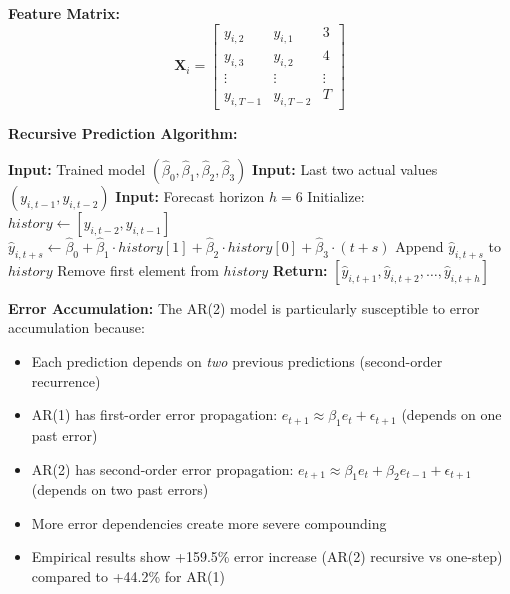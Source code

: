 \documentclass[12pt,a4paper]{article}
\begin{document}
\textbf{Feature Matrix:}
\begin{equation}
\mathbf{X}_i = \begin{bmatrix}
y_{i,2} & y_{i,1} & 3 \\
y_{i,3} & y_{i,2} & 4 \\
\vdots & \vdots & \vdots \\
y_{i,T-1} & y_{i,T-2} & T
\end{bmatrix}
\end{equation}

\textbf{Recursive Prediction Algorithm:}

\begin{algorithm}[H]
\caption{AR(2) Recursive Multi-Step Forecasting}
\begin{algorithmic}[1]
\State \textbf{Input:} Trained model $(\hat{\beta}_0, \hat{\beta}_1, \hat{\beta}_2, \hat{\beta}_3)$
\State \textbf{Input:} Last two actual values $(y_{i,t-1}, y_{i,t-2})$
\State \textbf{Input:} Forecast horizon $h = 6$
\State Initialize: $history \gets [y_{i,t-2}, y_{i,t-1}]$
    \State $\hat{y}_{i,t+s} \gets \hat{\beta}_0 + \hat{\beta}_1 \cdot history[1] + \hat{\beta}_2 \cdot history[0] + \hat{\beta}_3 \cdot (t+s)$
    \State Append $\hat{y}_{i,t+s}$ to $history$
    \State Remove first element from $history$ 
\EndFor
\State \textbf{Return:} $[\hat{y}_{i,t+1}, \hat{y}_{i,t+2}, \ldots, \hat{y}_{i,t+h}]$
\end{algorithmic}
\end{algorithm}

\textbf{Error Accumulation:}
The AR(2) model is particularly susceptible to error accumulation because:
\begin{itemize}
    \item Each prediction depends on \textit{two} previous predictions (second-order recurrence)
    \item AR(1) has first-order error propagation: $e_{t+1} \approx \beta_1 e_t + \epsilon_{t+1}$ (depends on one past error)
    \item AR(2) has second-order error propagation: $e_{t+1} \approx \beta_1 e_t + \beta_2 e_{t-1} + \epsilon_{t+1}$ (depends on two past errors)
    \item More error dependencies create more severe compounding
    \item Empirical results show +159.5\% error increase (AR(2) recursive vs one-step) compared to +44.2\% for AR(1)
\end{itemize}
\end{document}
